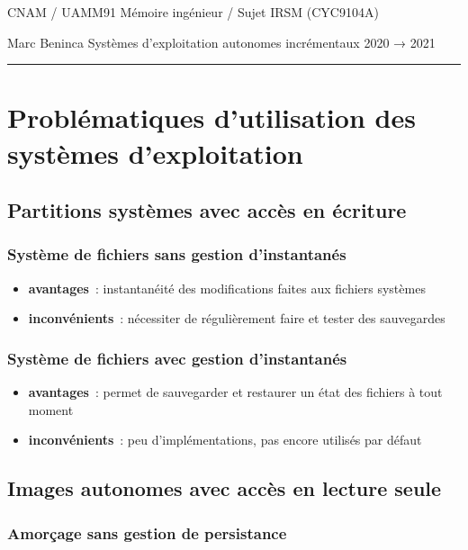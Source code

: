 \documentclass[10pt]{article}
\newcommand{\hr}{\rule{\textwidth}{1pt}}
\newenvironment{itmz}{\begin{itemize}
\setlength{\itemsep}{0em}
}{\end{itemize}}
\begin{document}
CNAM / UAMM91 \hfill Mémoire ingénieur / Sujet \hfill IRSM (CYC9104A)

Marc Beninca \hfill Systèmes d’exploitation autonomes incrémentaux \hfill 2020 → 2021

\hr

\section{Problématiques d’utilisation des systèmes d’exploitation}

\subsection{Partitions systèmes avec accès en écriture}

\subsubsection{Système de fichiers sans gestion d’instantanés}

\begin{itmz}
\item{\textbf{avantages} : instantanéité des modifications faites aux fichiers systèmes}
\item{\textbf{inconvénients} : nécessiter de régulièrement faire et tester des sauvegardes}
\end{itmz}

\subsubsection{Système de fichiers avec gestion d’instantanés}

\begin{itmz}
\item{\textbf{avantages} : permet de sauvegarder et restaurer un état des fichiers à tout moment}
\item{\textbf{inconvénients} : peu d’implémentations, pas encore utilisés par défaut}
\end{itmz}

\subsection{Images autonomes avec accès en lecture seule}

\subsubsection{Amorçage sans gestion de persistance}
\end{document}
